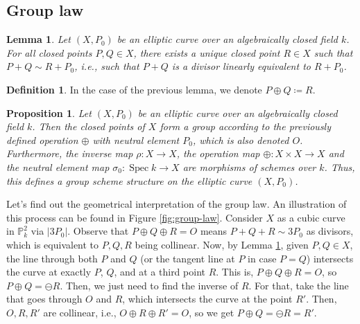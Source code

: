 \documentclass{report}
\DeclareMathOperator{\Spec}{Spec}
\newtheorem{proposition}[equation]{Proposition}
\newtheorem{lemma}[equation]{Lemma}
\theoremstyle{definition}
\newtheorem{definition}[equation]{Definition}
\begin{document}
\subsection{Group law}
\label{Sse:elliptic-curves-group-law}

\begin{lemma}
\label{Lem:existscollinear}
Let $(X,P_0)$ be an elliptic curve over an algebraically closed field $k$. For all closed points $P,Q\in X$, there exists a unique closed point $R\in X$ such that $P+Q\sim R+P_0$, i.e., such that $P+Q$ is a divisor linearly equivalent to $R+P_0$.
\end{lemma}

\begin{definition}
In the case of the previous lemma, we denote $P\oplus Q\coloneqq R$.
\end{definition}

\begin{proposition}
Let $(X,P_0)$ be an elliptic curve over an algebraically closed field $k$. Then the closed points of $X$ form a group according to the previously defined operation $\oplus$ with neutral element $P_0$, which is also denoted $O$. Furthermore, the inverse map $\rho:X\rightarrow X$, the operation map $\oplus:X\times X\rightarrow X$ and the neutral element map $\sigma_0:\Spec k\rightarrow X$ are morphisms of schemes over $k$. Thus, this defines a group scheme structure on the elliptic curve $(X,P_0)$.
\end{proposition}

Let's find out the geometrical interpretation of the group law. An illustration of this process can be found in Figure \ref{fig:group-law}. Consider $X$ as a cubic curve in $\mathbb{P}_k^2$ via $|3P_0|$. Observe that $P\oplus Q\oplus R=O$ means $P+Q+R\sim3P_0$ as divisors, which is equivalent to $P,Q,R$ being collinear. Now, by Lemma \ref{Lem:existscollinear}, given $P,Q\in X$, the line through both $P$ and $Q$ (or the tangent line at $P$ in case $P=Q$) intersects the curve at exactly $P$, $Q$, and at a third point $R$. This is, $P\oplus Q\oplus R=O$, so $P\oplus Q=\ominus R$. Then, we just need to find the inverse of $R$. For that, take the line that goes through $O$ and $R$, which intersects the curve at the point $R'$. Then, $O,R,R'$ are collinear, i.e., $O\oplus R\oplus R'=O$, so we get $P\oplus Q=\ominus R=R'$.
\end{document}
